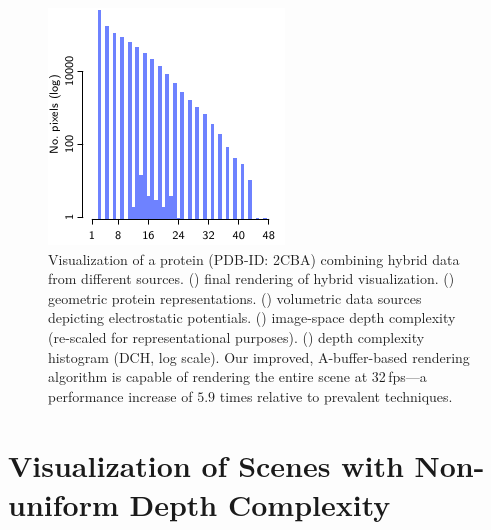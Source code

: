 \documentclass{egpubl}
\newcommand{\ab}{\mbox{A-buffer}}
\newlength{\boxheight}
\begin{document}
\begin{figure}[tcb]
\begin{minipage}[b][\boxheight][b]{0.24\linewidth}
\begin{minipage}[b]{0.98\linewidth}
      \includegraphics[width=1\linewidth]{figures/plot-dch-mol}\vspace{-2mm}
    \end{minipage}%
  \end{minipage}%
  \caption{\label{fig:protein}%
    Visualization of a protein (PDB-ID: 2CBA) combining hybrid data from different sources.
    () final rendering of hybrid visualization.
    () geometric protein representations. 
    () volumetric data sources depicting electrostatic potentials. 
    () image-space depth complexity (re-scaled for representational purposes). 
    () depth complexity histogram (DCH, log scale). %
    Our improved, \ab{}-based rendering algorithm is capable of rendering the entire scene at 32\,fps---a performance increase of $5.9$ times relative to prevalent techniques. %
  }
\end{figure}



\section{Visualization of Scenes with Non-uniform Depth Complexity}
\label{sec:depthcomplexity}
\end{document}

